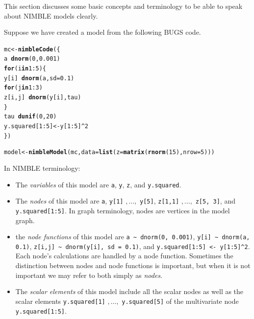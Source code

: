 \documentclass[12pt,oneside]{book}\usepackage[]{graphicx}\usepackage[]{color}
\makeatletter
\newcommand{\hlnum}[1]{\textcolor[rgb]{0.686,0.059,0.569}{#1}}%
\newcommand{\hlopt}[1]{\textcolor[rgb]{0,0,0}{#1}}%
\newcommand{\hlstd}[1]{\textcolor[rgb]{0.345,0.345,0.345}{#1}}%
\newcommand{\hlkwa}[1]{\textcolor[rgb]{0.161,0.373,0.58}{\textbf{#1}}}%
\newcommand{\hlkwb}[1]{\textcolor[rgb]{0.69,0.353,0.396}{#1}}%
\newcommand{\hlkwc}[1]{\textcolor[rgb]{0.333,0.667,0.333}{#1}}%
\newcommand{\hlkwd}[1]{\textcolor[rgb]{0.737,0.353,0.396}{\textbf{#1}}}%
\newenvironment{kframe}{%
 \def\at@end@of@kframe{}%
 \ifinner\ifhmode%
  \def\at@end@of@kframe{\end{minipage}}%
  \begin{minipage}{\columnwidth}%
 \fi\fi%
 \def\FrameCommand##1{\hskip\@totalleftmargin \hskip-\fboxsep
 \colorbox{shadecolor}{##1}\hskip-\fboxsep
     \hskip-\linewidth \hskip-\@totalleftmargin \hskip\columnwidth}%
 \MakeFramed {\advance\hsize-\width
   \@totalleftmargin\z@ \linewidth\hsize
   \@setminipage}}%
 {\par\unskip\endMakeFramed%
 \at@end@of@kframe}
\newenvironment{knitrout}{}{} %
\def\cd#1{\texttt{#1}}
\makeatother
\begin{document}
This section discusses some basic concepts and terminology to
be able to speak about NIMBLE models clearly.

Suppose we have created a model from the following BUGS code.



\begin{knitrout}
\color{fgcolor}\begin{kframe}
\begin{alltt}
\hlstd{mc} \hlkwb{<-} \hlkwd{nimbleCode}\hlstd{(\{}
    \hlstd{a} \hlopt{~} \hlkwd{dnorm}\hlstd{(}\hlnum{0}\hlstd{,} \hlnum{0.001}\hlstd{)}
    \hlkwa{for}\hlstd{(i} \hlkwa{in} \hlnum{1}\hlopt{:}\hlnum{5}\hlstd{) \{}
        \hlstd{y[i]} \hlopt{~} \hlkwd{dnorm}\hlstd{(a,} \hlkwc{sd} \hlstd{=} \hlnum{0.1}\hlstd{)}
        \hlkwa{for}\hlstd{(j} \hlkwa{in} \hlnum{1}\hlopt{:}\hlnum{3}\hlstd{)}
            \hlstd{z[i,j]} \hlopt{~} \hlkwd{dnorm}\hlstd{(y[i], tau)}
    \hlstd{\}}
    \hlstd{tau} \hlopt{~} \hlkwd{dunif}\hlstd{(}\hlnum{0}\hlstd{,} \hlnum{20}\hlstd{)}
    \hlstd{y.squared[}\hlnum{1}\hlopt{:}\hlnum{5}\hlstd{]} \hlkwb{<-} \hlstd{y[}\hlnum{1}\hlopt{:}\hlnum{5}\hlstd{]}\hlopt{^}\hlnum{2}
\hlstd{\})}

\hlstd{model} \hlkwb{<-} \hlkwd{nimbleModel}\hlstd{(mc,} \hlkwc{data} \hlstd{=} \hlkwd{list}\hlstd{(}\hlkwc{z} \hlstd{=} \hlkwd{matrix}\hlstd{(}\hlkwd{rnorm}\hlstd{(}\hlnum{15}\hlstd{),} \hlkwc{nrow} \hlstd{=} \hlnum{5}\hlstd{)))}
\end{alltt}
\end{kframe}
\end{knitrout}

In NIMBLE terminology:
\begin{itemize}
\item The \textit{variables} of this model are \cd{a}, \cd{y}, \cd{z},
  and \cd{y.squared}.
\item The \textit{nodes} of this model are \cd{a}, \cd{y[1]} $,\ldots,$
  \cd{y[5]}, \cd{z[1,1]} $,\ldots,$ \cd{z[5, 3]}, and
  \cd{y.squared[1:5]}.  In graph terminology, nodes are vertices in
  the model graph.
\item the \textit{node functions} of this model are
  \verb|a ~ dnorm(0, 0.001)|, \verb|y[i] ~ dnorm(a, 0.1)|,
  \verb|z[i,j] ~ dnorm(y[i], sd = 0.1)|, and
  \verb|y.squared[1:5] <- y[1:5]^2|.  Each node's calculations are
  handled by a node function.  Sometimes the distinction between
  nodes and node functions is important, but when it is not important
  we may refer to both simply as \textit{nodes}.  
\item  The \textit{scalar elements} of this model include all the scalar
  nodes as well as the scalar elements \cd{y.squared[1]} $,\ldots,$
  \cd{y.squared[5]} of the multivariate node \cd{y.squared[1:5]}.
\end{itemize}
\end{document}
